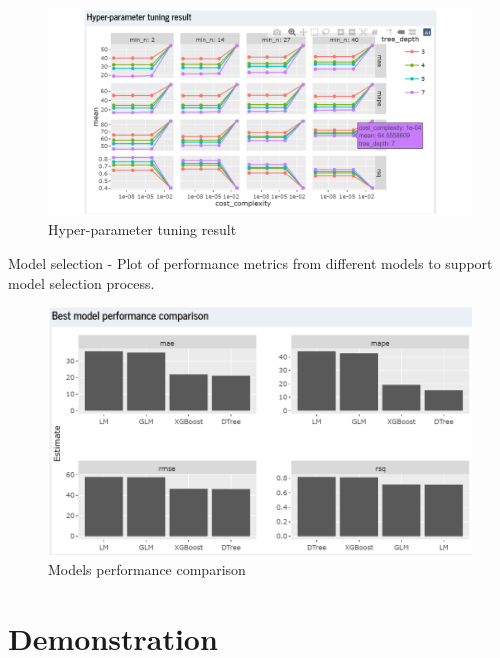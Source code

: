 \documentclass{acm_proc_article-sp}
\begin{document}
\begin{figure}[H]

{\centering \includegraphics[width=1\linewidth]{images/hypartune} 

}

\caption{Hyper-parameter tuning result}\label{fig:unnamed-chunk-11}
\end{figure}

Model selection - Plot of performance metrics from different models to
support model selection process.

\begin{figure}[H]

{\centering \includegraphics[width=1\linewidth]{images/mdlcompare} 

}

\caption{Models performance comparison}\label{fig:unnamed-chunk-12}
\end{figure}

\hypertarget{demonstration}{%
\section{Demonstration}\label{demonstration}}
\end{document}
